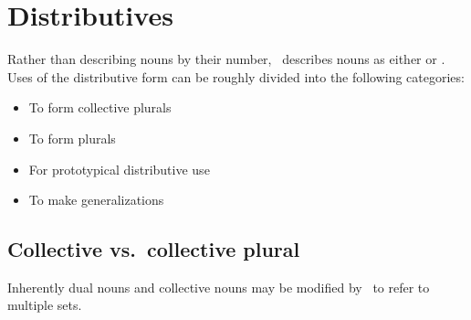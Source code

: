 \section{Distributives}
Rather than describing nouns by their number, \langname\ describes nouns as either  or .
Uses of the distributive form can be roughly divided into the following categories:

\begin{itemize}
  \item To form collective plurals
  \item To form plurals
  \item For prototypical distributive use
  \item To make generalizations
\end{itemize}

\subsection{Collective vs.\ collective plural}
Inherently dual nouns and collective nouns  may be modified by \DST\ to refer to multiple  sets.



